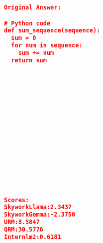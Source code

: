 \begin{lstlisting}[language=json,numbers=none]
Original Answer:

# Python code
def sum_sequence(sequence):
  sum = 0
  for num in sequence:
    sum += num
  return sum















  
Scores:
SkyworkLlama:2.3437
SkyworkGemma:-2.3750
URM:8.5847
QRM:30.5776
Internlm2:0.6181
\end{lstlisting}